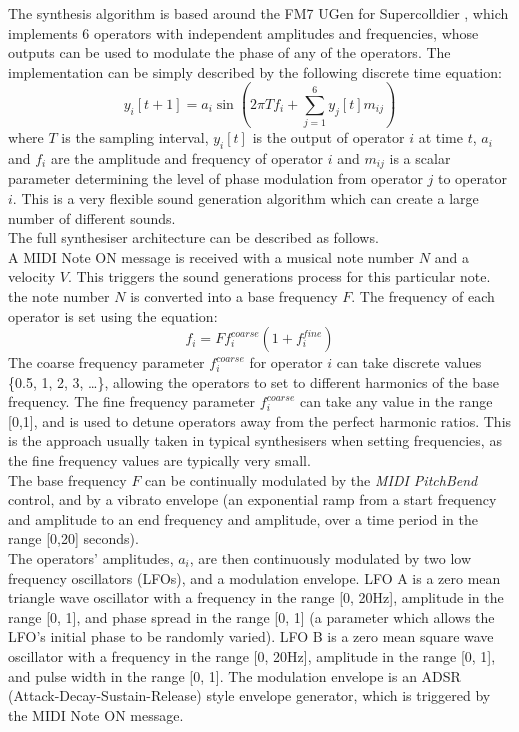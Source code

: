 \documentclass[11pt, oneside]{report}   	%
\begin{document}
The synthesis algorithm is based around the FM7 UGen for Supercolldier \cite{UGen}, which implements 6 operators with independent amplitudes and frequencies, whose outputs can be used to modulate the phase of any of the operators. The implementation can be simply described by the following discrete time equation: 
\begin{equation}
y_i[t+1] = a_i\sin(2\pi T f_i + \sum_{j = 1}^{6} y_j[t] m_{ij})
\end{equation}
where $T$ is the sampling interval,  $y_i[t]$ is the output of operator $i$ at time $t$, $a_i$ and $f_i$ are the amplitude and frequency of operator $i$ and $m_{ij}$ is a scalar parameter determining the level of phase modulation from operator $j$ to operator $i$. This is a very flexible sound generation algorithm which can create a large number of different sounds. \\
The full synthesiser architecture can be described as follows.\\
 A MIDI Note ON message is received with a musical note number $N$ and a velocity $V$. This triggers the sound generations process for this particular note. the note number $N$ is converted into a base frequency $F$. The frequency of each operator is set using the equation: 
 \begin{equation}
	f_i = Ff_i^{coarse}(1+f_i^{fine})
 \end{equation}
The coarse frequency parameter $f_i^{coarse}$ for operator $i$ can take discrete values \{0.5, 1, 2, 3, \dots\}, allowing the operators to set to different harmonics of the base frequency. The fine frequency parameter $f_i^{coarse}$ can take any value in the range [0,1], and is used to detune operators away from the perfect harmonic ratios. This is the approach usually taken in typical synthesisers when setting frequencies, as the fine frequency values are typically very small.\\
The base frequency $F$ can be continually modulated by the \emph{MIDI PitchBend} control, and by a vibrato envelope (an exponential ramp from a start frequency and amplitude to an end frequency and amplitude, over a time period in the range [0,20] seconds).\\
The operators' amplitudes, $a_i$, are then continuously modulated by two low frequency oscillators (LFOs), and a modulation envelope. LFO A is a zero mean triangle wave oscillator with a frequency in the range [0, 20\si{\hertz}], amplitude in the range [0, 1], and phase spread in the range [0, 1] (a parameter which allows the LFO's initial phase to be randomly varied). LFO B is a zero mean square wave oscillator with a frequency in the range [0, 20\si{\hertz}], amplitude in the range [0, 1], and pulse width in the range [0, 1]. The modulation envelope is an ADSR (Attack-Decay-Sustain-Release) style envelope generator, which is triggered by the MIDI Note ON message.
\end{document}
